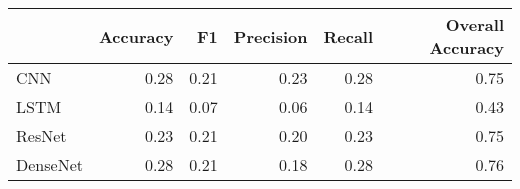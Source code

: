 \begin{tabular}{lrrrrr}
\toprule
{} &  Accuracy &    F1 &  Precision &  Recall &  Overall Accuracy \\
\midrule
CNN      &      0.28 &  0.21 &       0.23 &    0.28 &              0.75 \\
LSTM     &      0.14 &  0.07 &       0.06 &    0.14 &              0.43 \\
ResNet   &      0.23 &  0.21 &       0.20 &    0.23 &              0.75 \\
DenseNet &      0.28 &  0.21 &       0.18 &    0.28 &              0.76 \\
\bottomrule
\end{tabular}
